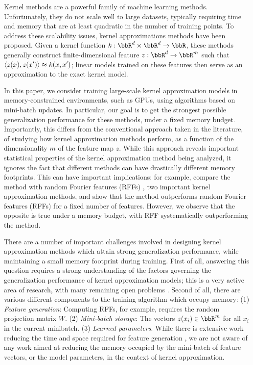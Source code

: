 Kernel methods are a powerful family of machine learning methods.  Unfortunately, they do not scale well to large datasets, typically requiring time and memory that are at least quadratic in the number of training points. To address these scalability issues, kernel approximations methods have been proposed. Given a kernel function $k:\RR^d\times\RR^d\rightarrow \RR$, these methods generally construct finite-dimensional feature $z: \RR^d \rightarrow \RR^m$ such that $\langle z(x),z(x') \rangle \approx k(x,x')$; linear models trained on these features then serve as an approximation to the exact kernel model. 

In this paper, we consider training large-scale kernel approximation models in memory-constrained environments, such as GPUs, using algorithms based on mini-batch updates. In particular, our goal is to get the strongest possible generalization performance for these methods, under a fixed memory budget.  Importantly, this differs from the conventional approach taken in the literature, of studying how kernel approximation methods perform, as a function of the dimensionality $m$ of the feature map $z$. While this approach reveals important statistical properties of the kernel approximation method being analyzed, it ignores the fact that different methods can have drastically different memory footprints. This can have important implications: for example, \citet{nysvsrff12} compare the \Nystrom method \citep{nystrom} with random Fourier features (RFFs) \citep{rahimi07random}, two important kernel approximation methods, and show that the \Nystrom method \citep{nystrom} outperforms random Fourier features (RFFs) \citep{rahimi07random} for a fixed number of features.  However, we observe that the opposite is true under a memory budget, with RFF systematically outperforming the \Nystrom method.



There are a number of important challenges involved in designing kernel approximation methods which attain strong generalization performance, while maintaining a small memory footprint during training. First of all, answering this question requires a strong understanding of the factors governing the generalization performance of kernel approximation models; this is a very active area of research, with many remaining open problems \citep{rudi17,avron17,musco17,bach17}. Second of all, there are various different components to the training algorithm which occupy memory: (1) \textit{Feature generation}: Computing RFFs, for example, requires the random projection matrix $W$. (2) \textit{Mini-batch storage}: The vectors $z(x_i)\in\RR^m$ for all $x_i$ in the current minibatch. (3) \textit{Learned parameters}. While there is extensive work reducing the time and space required for feature generation \citep{fastfood,yu15,sphereRKS}, we are not aware of any work aimed at reducing the memory occupied by the mini-batch of feature vectors, or the model parameters, in the context of kernel approximation.

